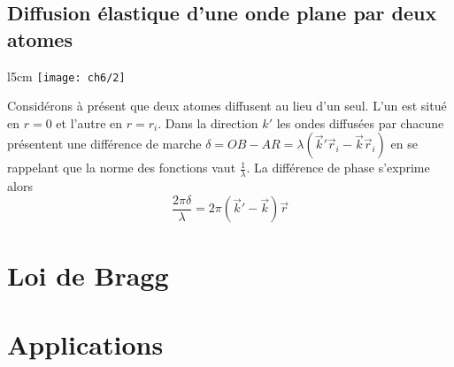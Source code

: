 	\subsection{Diffusion élastique d'une onde plane par deux atomes}
	\begin{wrapfigure}[4]{l}{5cm}
	\vspace{-5mm}
	\texttt{[image: ch6/2]}
	\end{wrapfigure}
	Considérons à présent que deux atomes diffusent au lieu d'un seul. L'un est situé en $r=0$ et l'autre en $r=r_i$. Dans la direction $k'$ les ondes diffusées par chacune présentent une différence de marche $\delta = OB-AR=\lambda (\vec{k}'\vec{r}_i - \vec{k}\vec{r}_i)$ en se rappelant que la norme des fonctions vaut $\frac{1}{\lambda}$. La différence de phase s'exprime alors 
	\begin{equation}
		\frac{2\pi \delta}{\lambda} = 2\pi (\vec{k}'-\vec{k})\vec{r}
	\end{equation}
\section{Loi de Bragg}
\section{Applications}